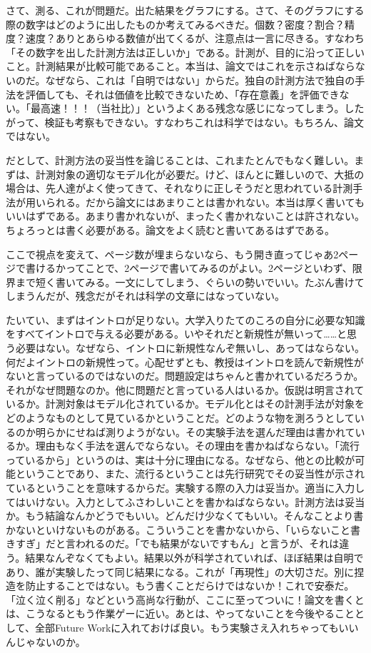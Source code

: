 \documentclass[9pt,b5paper,tombo,openany]{jsbook}
\begin{document}
さて、測る、これが問題だ。出た結果をグラフにする。さて、そのグラフにする際の数字はどのように出したものか考えてみるべきだ。個数？密度？割合？精度？速度？ありとあらゆる数値が出てくるが、注意点は一言に尽きる。すなわち「その数字を出した計測方法は正しいか」である。計測が、目的に沿って正しいこと。計測結果が比較可能であること。本当は、論文ではこれを示さねばならないのだ。なぜなら、これは「自明ではない」からだ。独自の計測方法で独自の手法を評価しても、それは価値を比較できないため、「存在意義」を評価できない。「最高速！！！（当社比）」というよくある残念な感じになってしまう。したがって、検証も考察もできない。すなわちこれは科学ではない。もちろん、論文ではない。

だとして、計測方法の妥当性を論じることは、これまたとんでもなく難しい。まずは、計測対象の適切なモデル化が必要だ。けど、ほんとに難しいので、大抵の場合は、先人達がよく使ってきて、それなりに正しそうだと思われている計測手法が用いられる。だから論文にはあまりことは書かれない。本当は厚く書いてもいいはずである。あまり書かれないが、まったく書かれないことは許されない。ちょろっとは書く必要がある。論文をよく読むと書いてあるはずである。

ここで視点を変えて、ページ数が埋まらないなら、もう開き直ってじゃあ2ページで書けるかってことで、2ページで書いてみるのがよい。2ページといわず、限界まで短く書いてみる。一文にしてしまう、ぐらいの勢いでいい。たぶん書けてしまうんだが、残念だがそれは科学の文章にはなっていない。

たいてい、まずはイントロが足りない。大学入りたてのころの自分に必要な知識をすべてイントロで与える必要がある。いやそれだと新規性が無いって……と思う必要はない。なぜなら、イントロに新規性なんぞ無いし、あってはならない。何だよイントロの新規性って。心配せずとも、教授はイントロを読んで新規性がないと言っているのではないのだ。問題設定はちゃんと書かれているだろうか。それがなぜ問題なのか。他に問題だと言っている人はいるか。仮説は明言されているか。計測対象はモデル化されているか。モデル化とはその計測手法が対象をどのようなものとして見ているかということだ。どのような物を測ろうとしているのか明らかにせねば測りようがない。その実験手法を選んだ理由は書かれているか。理由もなく手法を選んでならない。その理由を書かねばならない。「流行っているから」というのは、実は十分に理由になる。なぜなら、他との比較が可能ということであり、また、流行るということは先行研究でその妥当性が示されているということを意味するからだ。実験する際の入力は妥当か。適当に入力してはいけない。入力としてふさわしいことを書かねばならない。計測方法は妥当か。もう結論なんかどうでもいい。どんだけ少なくてもいい。そんなことより書かないといけないものがある。こういうことを書かないから、「いらないこと書きすぎ」だと言われるのだ。「でも結果がないですもん」と言うが、それは違う。結果なんぞなくてもよい。結果以外が科学されていれば、ほぼ結果は自明であり、誰が実験したって同じ結果になる。これが「再現性」の大切さだ。別に捏造を防止することではない。もう書くことだらけではないか！これで安泰だ。「泣く泣く削る」などという高尚な行動が、ここに至ってついに！論文を書くとは、こうなるともう作業ゲーに近い。あとは、やってないことを今後やることとして、全部Future Workに入れておけば良い。もう実験さえ入れちゃってもいいんじゃないのか。
\end{document}
